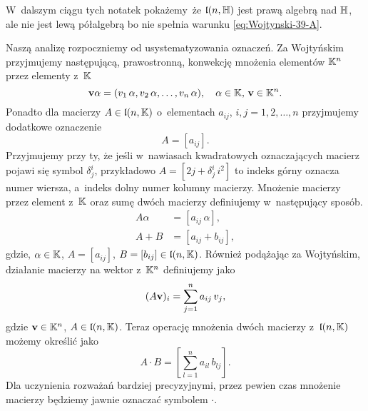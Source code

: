 \documentclass[a4paper,11pt]{article}
\begin{document}
W~dalszym ciągu tych notatek pokażemy~że $\mathfrak{l}( n, \mathbb{H} )$ jest prawą
algebrą nad $\mathbb{H}$, ale nie jest lewą półalgebrą bo nie spełnia warunku
\eqref{eq:Wojtynski-39-A}.

Naszą analizę rozpoczniemy od usystematyzowania oznaczeń. Za Wojtyńskim
przyjmujemy następującą, prawostronną, konwekcję mnożenia elementów
$\mathbb{K}^{ n }$ przez elementy z~$\mathbb{K}$
\begin{equation}
  \label{eq:Wojtynski-40}
  \mathbf{v} \alpha = ( v_{ 1 } \, \alpha, v_{ 2 } \, \alpha, \ldots, v_{ n } \, \alpha ), \quad
  \alpha \in \mathbb{K}, \, \mathbf{v} \in \mathbb{K}^{ n }.
\end{equation}
Ponadto dla macierzy $A \in \mathfrak{l}( n, \mathbb{K} )$ o~elementach $a_{ ij }$,
$i, j = 1, 2, \ldots, n$ przyjmujemy dodatkowe oznaczenie
\begin{equation}
  \label{eq:Wojtynski-41}
  A = [ a_{ i j } ].
\end{equation}
Przyjmujemy przy ty, że jeśli w~nawiasach kwadratowych oznaczających macierz
pojawi się symbol $\delta^{ i }_{ j }$, przykładowo
$A = [ 2 j + \delta^{ i }_{ j } \, i^{ 2 } ]$ to indeks górny oznacza numer
wiersza, a~indeks dolny numer kolumny macierzy. Mnożenie macierzy przez
element z~$\mathbb{K}$ oraz sumę dwóch macierzy definiujemy w~następujący sposób.
\begin{subequations}
  \begin{align}
    \label{eq:Wojtynski-42-A}
    A \alpha &= [ a_{ i j } \, \alpha ], \\
    \label{eq:Wojtynski-42-B}
    A + B &= [ a_{ i j } + b_{ i j } ],
  \end{align}
\end{subequations}
gdzie, $\alpha \in \mathbb{K}$, $A = [ a_{ i j } ]$,
$B = [ b_{ i j } ] \in \mathfrak{l}( n, \mathbb{K} )$.
Również podążając za Wojtyńskim, działanie macierzy na wektor z~$\mathbb{K}^{ n }$
definiujemy jako
\begin{equation}
  \label{eq:Wojtynski-43}
  ( A \mathbf{v} )_{ i } = \sum_{ j = 1 }^{ n } a_{ i j } \, v_{ j },
\end{equation}
gdzie $\mathbf{v} \in \mathbb{K}^{ n }$, $A \in \mathfrak{l}( n, \mathbb{K} )$. Teraz operację
mnożenia dwóch macierzy z~$\mathfrak{l}( n, \mathbb{K} )$ możemy określić jako
\begin{equation}
  \label{eq:Wojtynski-44}
  A \cdot B = \left[ \sum_{ l = 1 }^{ n } a_{ i l } \, b_{ l j } \right].
\end{equation}
Dla uczynienia rozważań bardziej precyzyjnymi, przez pewien czas mnożenie
macierzy będziemy jawnie oznaczać symbolem $\cdot$.
\end{document}
